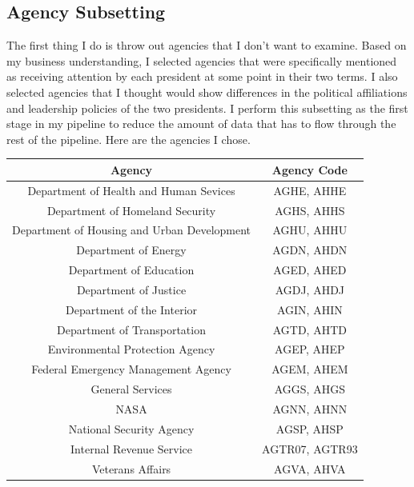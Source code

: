\documentclass{article}
\begin{document}
    \subsection{Agency Subsetting}
    The first thing I do is throw out agencies that I don't want to examine. Based on my business understanding, I selected agencies that were specifically mentioned as receiving attention by each president at some point in their two terms. I also selected agencies that I thought would show differences in the political affiliations and leadership policies of the two presidents. I perform this subsetting as the first stage in my pipeline to reduce the amount of data that has to flow through the rest of the pipeline. Here are the agencies I chose.

        \begin{center}
            \begin{tabular}{ |c|c| }
                \hline
                Agency & Agency Code \\
                \hline
                Department of Health and Human Sevices & AGHE, AHHE \\
                Department of Homeland Security & AGHS, AHHS \\
                Department of Housing and Urban Development & AGHU, AHHU \\
                Department of Energy & AGDN, AHDN \\
                Department of Education & AGED, AHED \\
                Department of Justice & AGDJ, AHDJ \\
                Department of the Interior & AGIN, AHIN \\
                Department of Transportation & AGTD, AHTD \\
                Environmental Protection Agency & AGEP, AHEP \\
                Federal Emergency Management Agency & AGEM, AHEM \\
                General Services & AGGS, AHGS \\
                NASA & AGNN, AHNN \\
                National Security Agency & AGSP, AHSP \\
                Internal Revenue Service & AGTR07, AGTR93 \\
                Veterans Affairs & AGVA, AHVA \\
                \hline
            \end{tabular}
        \end{center}
\end{document}

